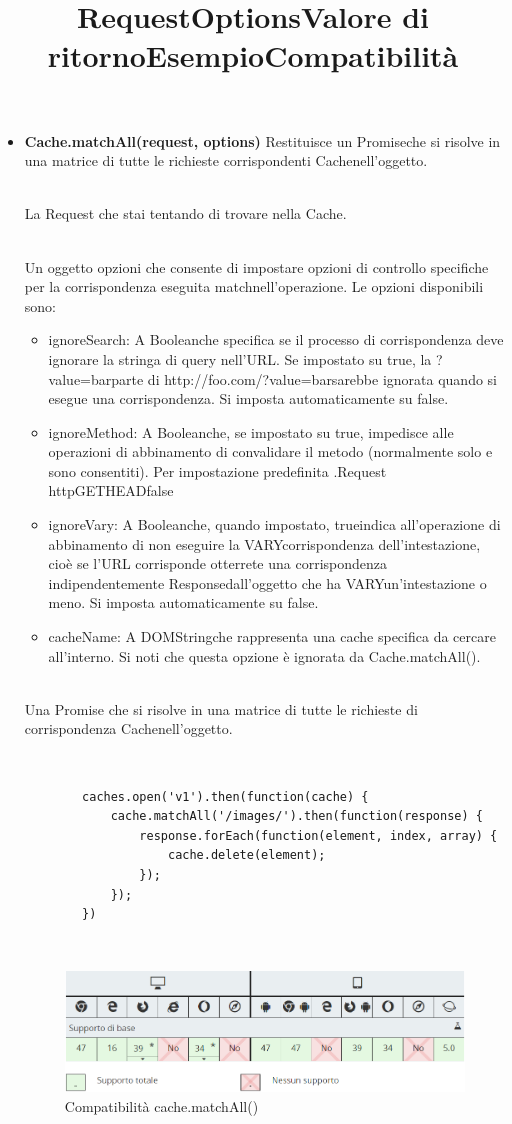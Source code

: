 \documentclass[italian]{article}
\begin{document}
\begin{itemize}
	\item \textbf{Cache.matchAll(request, options)}
	Restituisce un Promiseche si risolve in una matrice di tutte le richieste corrispondenti Cachenell'oggetto.\\
	\title{\textbf{Request}}\\
	La Request che stai tentando di trovare nella Cache.\\
	\title{\textbf{Options}}\\
	Un oggetto opzioni che consente di impostare opzioni di controllo specifiche per la corrispondenza eseguita matchnell'operazione. Le opzioni disponibili sono:
	\begin{itemize}
	\item ignoreSearch: A Booleanche specifica se il processo di corrispondenza deve ignorare la stringa di query nell'URL. Se impostato su true, la  ?value=barparte di http://foo.com/?value=barsarebbe ignorata quando si esegue una corrispondenza. Si imposta automaticamente su false.
	\item ignoreMethod: A Booleanche, se impostato su true, impedisce alle operazioni di abbinamento di convalidare il metodo (normalmente solo e sono consentiti). Per impostazione predefinita .Request httpGETHEADfalse
	\item ignoreVary: A Booleanche, quando impostato, trueindica all'operazione di abbinamento di non eseguire la VARYcorrispondenza dell'intestazione, cioè se l'URL corrisponde otterrete una corrispondenza indipendentemente Responsedall'oggetto che ha VARYun'intestazione o meno. Si imposta automaticamente su false.
	\item cacheName: A DOMStringche rappresenta una cache specifica da cercare all'interno. Si noti che questa opzione è ignorata da Cache.matchAll().
	\end{itemize}
	\title{\textbf{Valore di ritorno}}\\
	Una Promise che si risolve in una matrice di tutte le richieste di corrispondenza Cachenell'oggetto.
	\title{\textbf{Esempio}}\\
	\begin{lstlisting}
		caches.open('v1').then(function(cache) {
			cache.matchAll('/images/').then(function(response) {
				response.forEach(function(element, index, array) {
					cache.delete(element);
				});
			});
		})
	\end{lstlisting}
	\title{\textbf{Compatibilità}}\\
	\begin{figure}[h]
		\centering
		\includegraphics[width=1\linewidth]{c2}
		\caption{Compatibilità cache.matchAll()}
		\label{fig:Compatibilità cache.matchAll()}
	\end{figure}
	

\end{itemize}
\end{document}

